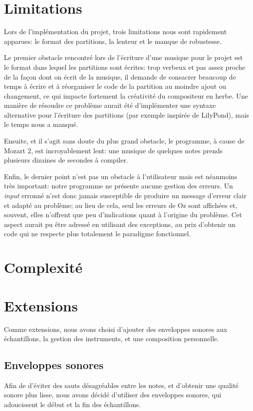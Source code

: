 \documentclass[a4paper,12pt]{article}
\begin{document}
\section{Limitations}

Lors de l'implémentation du projet, trois limitations nous sont rapidement apparues: le format des partitions, la lenteur et le manque de robustesse.

Le premier obstacle rencontré lors de l'écriture d'une musique pour le projet est le format dans lequel les partitions sont écrites: trop verbeux et pas assez proche de la façon dont on écrit de la musique, il demande de consacrer beaucoup de temps à écrire et à réorganiser le code de la partition au moindre ajout ou changement, ce qui impacte fortement la créativité du compositeur en herbe. Une manière de résoudre ce problème aurait été d'implémenter une syntaxe alternative pour l'écriture des partitions (par exemple inspirée de LilyPond\footnotemark), mais le temps nous a manqué.

Ensuite, et il s'agit sans doute du plus grand obstacle, le programme, à cause de Mozart 2, est incroyablement lent: une musique de quelques notes prends plusieurs dizaines de secondes à \og{}compiler\fg{}.

Enfin, le dernier point n'est pas un obstacle à l'utilisateur mais est néanmoins très important: notre programme ne présente aucune gestion des erreurs. Un \emph{input} erronné n'est donc jamais susceptible de produire un message d'erreur clair et adapté au problème; au lieu de cela, seul les erreurs de Oz sont affichées et, souvent, elles n'offrent que peu d'indications quant à l'origine du problème. Cet aspect aurait pu être adressé en utilisant des exceptions, au prix d'obtenir un code qui ne respecte plus totalement le paradigme fonctionnel.

\section{Complexité}

\section{Extensions}

Comme extensions, nous avons choisi d'ajouter des enveloppes sonores
aux échantillons, la gestion des instruments, et une composition personnelle.

\subsection{Enveloppes sonores}
\label{sec:enveloppes}
Afin de d'éviter des sauts désagréables entre les notes,
et d'obtenir une qualité sonore plus lisse,
nous avons décidé d'utiliser des enveloppes sonores,
qui adoucissent le début et la fin des échantillons.
\end{document}
